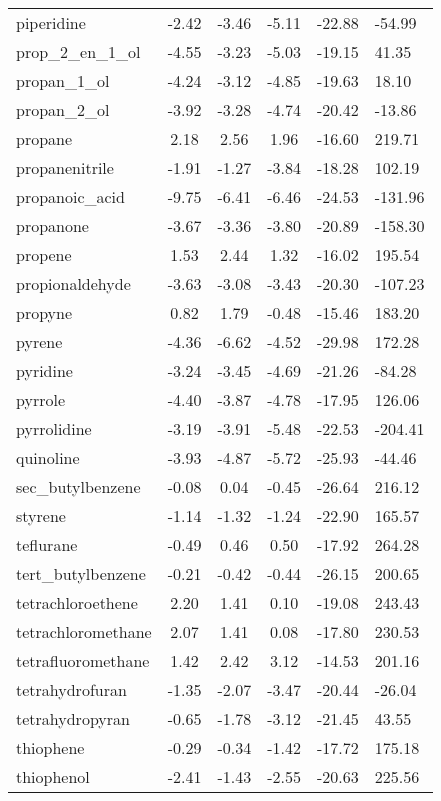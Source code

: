 \documentclass{amsart}
\begin{document}
\begin{longtable}{L|C|C|C|X|X}
piperidine & -2.42 & -3.46 & -5.11 & -22.88 & -54.99 \\ 
prop\_2\_en\_1\_ol & -4.55 & -3.23 & -5.03 & -19.15 & 41.35 \\ 
propan\_1\_ol & -4.24 & -3.12 & -4.85 & -19.63 & 18.10 \\ 
propan\_2\_ol & -3.92 & -3.28 & -4.74 & -20.42 & -13.86 \\ 
propane & 2.18 & 2.56 & 1.96 & -16.60 & 219.71 \\ 
propanenitrile & -1.91 & -1.27 & -3.84 & -18.28 & 102.19 \\ 
propanoic\_acid & -9.75 & -6.41 & -6.46 & -24.53 & -131.96 \\ 
propanone & -3.67 & -3.36 & -3.80 & -20.89 & -158.30 \\ 
propene & 1.53 & 2.44 & 1.32 & -16.02 & 195.54 \\ 
propionaldehyde & -3.63 & -3.08 & -3.43 & -20.30 & -107.23 \\ 
propyne & 0.82 & 1.79 & -0.48 & -15.46 & 183.20 \\ 
pyrene & -4.36 & -6.62 & -4.52 & -29.98 & 172.28 \\ 
pyridine & -3.24 & -3.45 & -4.69 & -21.26 & -84.28 \\ 
pyrrole & -4.40 & -3.87 & -4.78 & -17.95 & 126.06 \\ 
pyrrolidine & -3.19 & -3.91 & -5.48 & -22.53 & -204.41 \\ 
quinoline & -3.93 & -4.87 & -5.72 & -25.93 & -44.46 \\ 
sec\_butylbenzene & -0.08 & 0.04 & -0.45 & -26.64 & 216.12 \\ 
styrene & -1.14 & -1.32 & -1.24 & -22.90 & 165.57 \\ 
teflurane & -0.49 & 0.46 & 0.50 & -17.92 & 264.28 \\ 
tert\_butylbenzene & -0.21 & -0.42 & -0.44 & -26.15 & 200.65 \\ 
tetrachloroethene & 2.20 & 1.41 & 0.10 & -19.08 & 243.43 \\ 
tetrachloromethane & 2.07 & 1.41 & 0.08 & -17.80 & 230.53 \\ 
tetrafluoromethane & 1.42 & 2.42 & 3.12 & -14.53 & 201.16 \\ 
tetrahydrofuran & -1.35 & -2.07 & -3.47 & -20.44 & -26.04 \\ 
tetrahydropyran & -0.65 & -1.78 & -3.12 & -21.45 & 43.55 \\ 
thiophene & -0.29 & -0.34 & -1.42 & -17.72 & 175.18 \\ 
thiophenol & -2.41 & -1.43 & -2.55 & -20.63 & 225.56 \\ 

\end{longtable}
\end{document}
